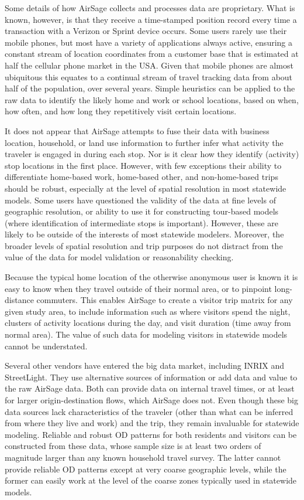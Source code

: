 Some details of how AirSage collects and processes data are proprietary. What is known, however, is that they receive a time-stamped position record every time a transaction with a Verizon or Sprint device occurs. Some users rarely use their mobile phones, but most have a variety of applications always active, ensuring a constant stream of location coordinates from a customer base that is estimated at half the cellular phone market in the USA. Given that mobile phones are almost ubiquitous this equates to a continual stream of travel tracking data from about half of the population, over several years. Simple heuristics can be applied to the raw data to identify the likely home and work or school locations, based on when, how often, and how long they repetitively visit certain locations.

It does not appear that AirSage attempts to fuse their data with business location, household, or land use information to further infer what activity the traveler is engaged in during each stop. Nor is it clear how they identify (activity) stop locations in the first place. However, with few exceptions their ability to differentiate home-based work, home-based other, and non-home-based trips should be robust, especially at the level of spatial resolution in most statewide models. Some users have questioned the validity of the data at fine levels of geographic resolution, or ability to use it for constructing tour-based models (where identification of intermediate stops is important). However, these are likely to be outside of the interests of most statewide modelers. Moreover, the broader levels of spatial resolution and trip purposes do not distract from the value of the data for model validation or reasonability checking.

Because the typical home location of the otherwise anonymous user is known it is easy to know when they travel outside of their normal area, or to pinpoint long-distance commuters. This enables AirSage to create a visitor trip matrix for any given study area, to include information such as where visitors spend the night, clusters of activity locations during the day, and visit duration (time away from normal area). The value of such data for modeling visitors in statewide models cannot be understated.

Several other vendors have entered the big data market, including INRIX and StreetLight. They use alternative sources of information or add data and value to the raw AirSage data. Both can provide data on internal travel times, or at least for larger origin-destination flows, which AirSage does not. Even though these big data sources lack characteristics of the traveler (other than what can be inferred from where they live and work) and the trip, they remain invaluable for statewide modeling. Reliable and robust OD patterns for both residents and visitors can be constructed from these data, whose sample size is at least two orders of magnitude larger than any known household travel survey. The latter cannot provide reliable OD patterns except at very coarse geographic levels, while the former can easily work at the level of the coarse zones typically used in statewide models.

